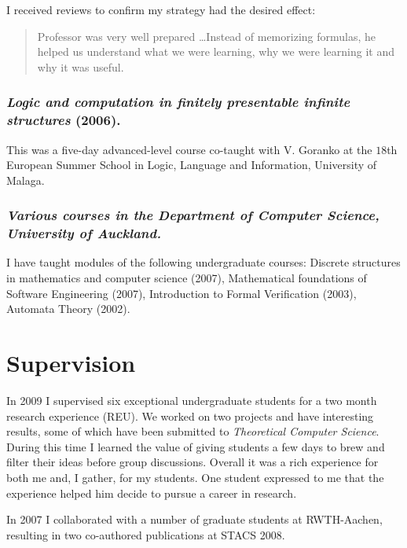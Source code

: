 \documentclass{article}[12pt]
\theoremstyle{plain} \numberwithin{equation}{section}
\theoremstyle{definition}
\begin{document}

I received reviews to confirm my strategy had the desired effect:
\begin{quote}
Professor was very well prepared \dots Instead of memorizing formulas, he helped us understand what we were learning, why we
were learning it and why it was useful.
\end{quote}


\subsubsection*{{\em Logic and computation in finitely presentable infinite structures} (2006).}
This was a five-day advanced-level course co-taught with V. Goranko at the $18$th European Summer School in Logic, Language and Information, University of Malaga.
 
 
\subsubsection*{\em Various courses in the Department of Computer Science, University of Auckland.}
I have taught modules of the following undergraduate courses: Discrete structures in mathematics and computer science (2007),
Mathematical foundations of Software Engineering (2007), Introduction to Formal Verification (2003), Automata Theory (2002).

\section*{Supervision}


In 2009 I supervised six exceptional undergraduate students for a two month research experience (REU). We worked on two projects and have interesting results, some of which have been submitted to {\em Theoretical Computer Science}. During this time I learned the value of giving students a few days to brew and filter their ideas before group discussions.
Overall it was a rich experience for both me and, I gather, for my students. One student expressed to me that the experience helped him decide to pursue a career in research.

In 2007 I collaborated with a number of graduate students at RWTH-Aachen, resulting in two co-authored publications at STACS 2008.
\end{document}
